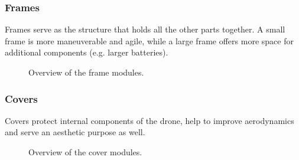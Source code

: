 \documentclass[sigconf,review]{acmart}
\begin{document}
\subsubsection{Frames}
\label{sec:frames}

Frames serve as the structure that holds all the other parts together. 
A small frame is more maneuverable and agile, while a large frame offers more space for additional components (e.g. larger batteries).

\begin{figure}[htbp]
    \hfill

    \caption{Overview of the frame modules.}
    \label{fig:frames}
\end{figure}

\subsubsection{Covers}
\label{sec:covers}

Covers protect internal components of the drone, help to improve aerodynamics and serve an aesthetic purpose as well.

\begin{figure}[htbp]
    
    \hfill
    \caption{Overview of the cover modules.}
    \label{fig:atomic-modules}
\end{figure}
\end{document}
